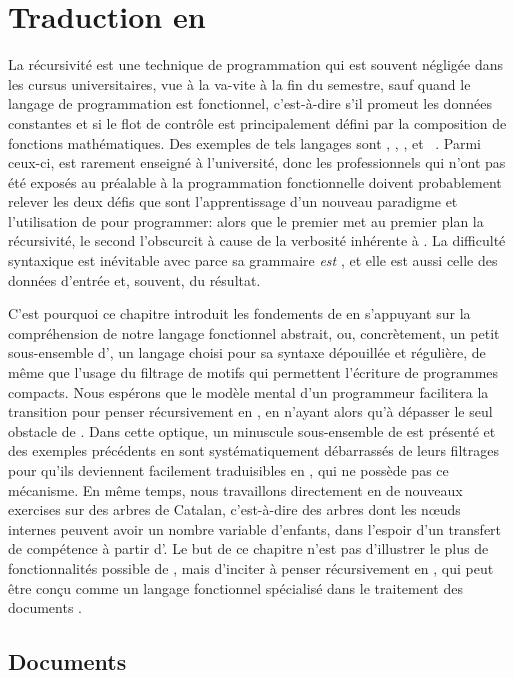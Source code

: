 \chapter{Traduction en \XSLT}

La récursivité est une technique de programmation qui est souvent
négligée dans les cursus universitaires, vue à la va-vite à la fin du
semestre, sauf quand le langage de programmation est fonctionnel,
c'est-à-dire s'il promeut les données constantes et si le flot de
contrôle est principalement défini par la composition de fonctions
mathématiques. Des exemples de tels langages sont \Scheme, \Haskell,
\OCaml, \Erlang et \XSLT~\citep{Kay_2008}. Parmi ceux-ci, \XSLT est
rarement enseigné à l'université, donc les professionnels qui n'ont
pas été exposés au préalable à la programmation fonctionnelle doivent
probablement relever les deux défis que sont l'apprentissage d'un
nouveau paradigme et l'utilisation de \XML pour programmer: alors que
le premier met au premier plan la récursivité, le second l'obscurcit à
cause de la verbosité inhérente à \XML. La difficulté syntaxique est
inévitable avec \XSLT parce sa grammaire \emph{est} \XML, et elle est
aussi celle des données d'entrée et, souvent, du résultat.

C'est pourquoi ce chapitre introduit les fondements de \XSLT en
s'appuyant sur la compréhension de notre langage fonctionnel abstrait,
ou, concrètement, un petit sous-ensemble d'\Erlang, un langage choisi
pour sa syntaxe dépouillée et régulière, de même que l'usage du
filtrage de motifs qui permettent l'écriture de programmes
compacts. Nous espérons que le modèle mental d'un programmeur \Erlang
facilitera la transition pour penser récursivement en \XSLT, en
n'ayant alors qu'à dépasser le seul obstacle de \XML. Dans cette
optique, un minuscule sous-ensemble de \XSLT est présenté et des
exemples précédents en \Erlang sont systématiquement débarrassés de
leurs filtrages pour qu'ils deviennent facilement traduisibles en
\XSLT, qui ne possède pas ce mécanisme. En même temps, nous
travaillons directement en \XSLT de nouveaux exercises sur des arbres
de Catalan, c'est-à-dire des arbres dont les nœuds internes
peuvent avoir un nombre variable d'enfants, dans l'espoir d'un
transfert de compétence à partir d'\Erlang. Le but de ce chapitre
n'est pas d'illustrer le plus de fonctionnalités possible de \XSLT,
mais d'inciter à penser récursivement en \XSLT, qui peut être conçu
comme un langage fonctionnel spécialisé dans le traitement des
documents \XML.


\section{Documents}

